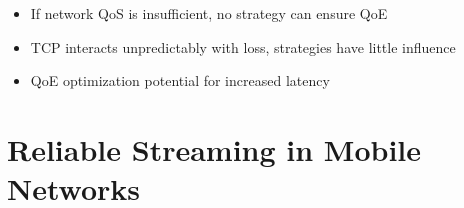 \documentclass{beamer}
\begin{document}
\begin{frame}
	\begin{itemize}
		\item If network QoS is insufficient, no strategy can ensure QoE
		\item TCP interacts unpredictably with loss, strategies have little influence
		\item QoE optimization potential for increased latency
	\end{itemize}


\end{frame}


\section{Reliable Streaming in Mobile Networks}
\end{document}
